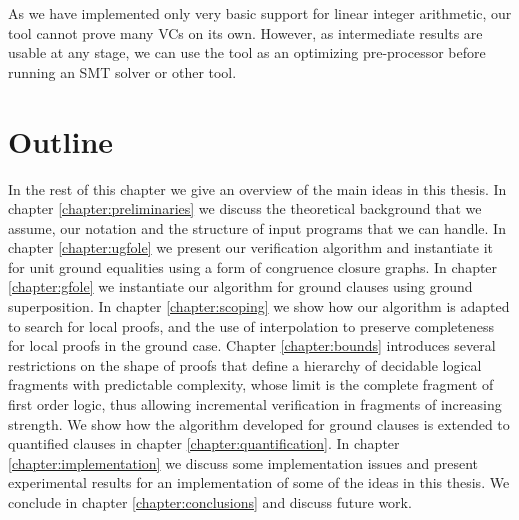 As we have implemented only very basic support for linear integer arithmetic, our tool cannot prove many VCs on its own. 
However, as intermediate results are usable at any stage, 
we can use the tool as an optimizing pre-processor before running an SMT solver or other tool.

\section{Outline}
In the rest of this chapter we give an overview of the main ideas in this thesis.
In chapter \ref{chapter:preliminaries} we discuss the theoretical background that we assume, our notation and the structure of input programs that we can handle.
In chapter \ref{chapter:ugfole} we present our verification algorithm and instantiate it for unit ground equalities using a form of congruence closure graphs.
In chapter \ref{chapter:gfole} we instantiate our algorithm for ground clauses using ground superposition.
In chapter \ref{chapter:scoping} we show how our algorithm is adapted to search for local proofs, and the use of interpolation to preserve completeness for local proofs in the ground case.
Chapter \ref{chapter:bounds} introduces several restrictions on the shape of proofs that define a hierarchy of decidable logical fragments with predictable complexity, whose limit is the complete fragment of first order logic, thus allowing incremental verification in fragments of increasing strength.
We show how the algorithm developed for ground clauses is extended to quantified clauses in chapter \ref{chapter:quantification}.
In chapter \ref{chapter:implementation} we discuss some implementation issues and present experimental results for an implementation of some of the ideas in this thesis.
We conclude in chapter \ref{chapter:conclusions} and discuss future work.


